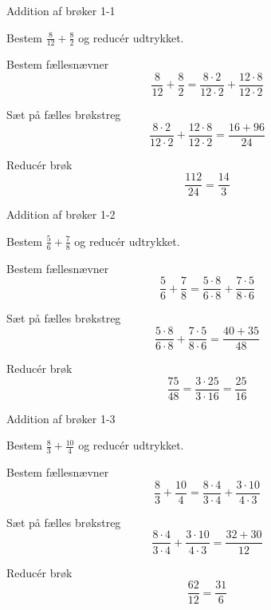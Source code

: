 \documentclass{article}
\begin{document}

	\tableofcontents
	\newpage
	
	\begin{exercise}{Addition af brøker 1-1}
		
		Bestem $\frac{8}{12}+\frac{8}{2}$ og reducér udtrykket.
		
		
		\hint
		
		Bestem fællesnævner
		\[
		\frac{8}{12}+\frac{8}{2}  = \frac{8 \cdot 2}{12 \cdot 2}+\frac{12 \cdot 8}{12\cdot 2} 
		\]
		
		\hint
		
		Sæt på fælles brøkstreg
		\[
		\frac{8 \cdot 2}{12 \cdot 2}+\frac{12 \cdot 8}{12\cdot 2} = \frac{16+96}{24} 
		\]
		
		\hint
		
		Reducér brøk
		\[
		\frac{112}{24} = \frac{14}{3}
		\]
		
	\end{exercise}
	
	\newpage
	
	\begin{exercise}{Addition af brøker 1-2}
		
		Bestem $\frac{5}{6}+\frac{7}{8}$ og reducér udtrykket.
		
		
		\hint
		
		Bestem fællesnævner
		\[
		\frac{5}{6}+\frac{7}{8}  = \frac{5 \cdot 8 }{6 \cdot 8}+\frac{7 \cdot 5}{8\cdot 6} 
		\]
		
		\hint
		
		Sæt på fælles brøkstreg
		\[
		\frac{5 \cdot 8 }{6 \cdot 8}+\frac{7 \cdot 5}{8\cdot 6}  = \frac{40+35}{48} 
		\]
		
		\hint
		
		Reducér brøk
		\[
		\frac{75}{48} = \frac{3 \cdot 25}{3 \cdot 16} = \frac{25}{16}
		\]
		
	\end{exercise}
	
	\newpage
	
	\begin{exercise}{Addition af brøker 1-3}
		
		Bestem $\frac{8}{3}+\frac{10}{4}$ og reducér udtrykket.
		
		
		\hint
		
		Bestem fællesnævner
		\[
		\frac{8}{3}+\frac{10}{4}  = \frac{8 \cdot 4 }{3 \cdot 4}+\frac{3 \cdot 10}{4\cdot 3} 
		\]
		
		\hint
		
		Sæt på fælles brøkstreg
		\[
		\frac{8 \cdot 4 }{3 \cdot 4}+\frac{3 \cdot 10}{4\cdot 3}  = \frac{32+30}{12} 
		\]
		
		\hint
		
		Reducér brøk
		\[
		\frac{62}{12} = \frac{31}{6}
		\]
		
	\end{exercise}
	
\end{document}

